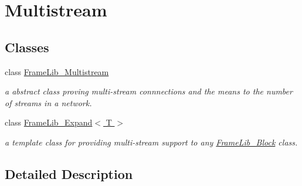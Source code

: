 \hypertarget{group___multistream}{}\section{Multistream}
\label{group___multistream}
\subsection*{Classes}
\begin{DoxyCompactItemize}
\item 
class \hyperlink{class_frame_lib___multistream}{Frame\+Lib\+\_\+\+Multistream}
\begin{DoxyCompactList}\small\item\em a abstract class proving multi-\/stream connnections and the means to the number of streams in a network. \end{DoxyCompactList}\item 
class \hyperlink{class_frame_lib___expand}{Frame\+Lib\+\_\+\+Expand$<$ T $>$}
\begin{DoxyCompactList}\small\item\em a template class for providing multi-\/stream support to any \hyperlink{class_frame_lib___block}{Frame\+Lib\+\_\+\+Block} class. \end{DoxyCompactList}\end{DoxyCompactItemize}


\subsection{Detailed Description}
